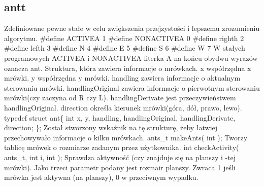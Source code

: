 \documentclass{article}
\begin{document}
\subsection{antt}
Zdefiniowane pewne stałe w celu zwiększenia przejzystości i lepszemu zrozumieniu algorytmu.
\newline \#define ACTIVEA 1
\newline \#define NONACTIVEA 0
\newline \#define righth 2 
\newline \#define lefth 3 
\newline \#define N 4
\newline \#define E 5
\newline \#define S 6
\newline \#define W 7
\newline W stałych programowych ACTIVEA i NONACTIVEA literka A na końcu obydwu wyrazów oznacza ant. 
\newline
\newline
Struktura, która zawiera informacje o mrówkach.
\newline    x współrzędna x mrówki.
\newline     y współrzędna y mrówki.
\newline     handling zawiera informacje o aktualnym sterowaniu mrówki.
\newline     handlingOriginal zawiera informacje o pierwotnym sterowaniu mrówki(czy zaczyna od R czy L).
\newline     handlingDerivate jest przeczywieństwem handlingOriginal.
\newline     direction określa kierunek mrówki(góra, dół, prawo, lewo).
\newline
\newline typedef struct ant\{
\newline    int x, y, handling, handlingOriginal, handlingDerivate, direction;
\newline\};
\newline Został stworzony wskaźnik na tę strukturę, żeby łatwiej przechowywało informacje o kilku mrówkach.
\newline
\newline ants\_t makeAnts( int );
\newline Tworzy tablicę mrówek o rozmiarze zadanym przez użytkownika.
\newpage
int checkActivity( ants\_t, int i, int );
\newline Sprawdza aktywność (czy znajduje się na planszy i -tej mrówki). Jako trzeci parametr podany jest rozmair planszy. Zwraca 1 jeśli mrówka jest aktywna (na planszy), 0 w przeciwnym wypadku.
\end{document}
